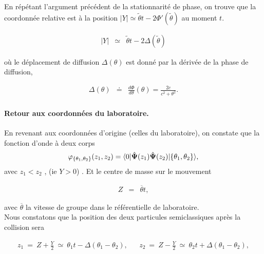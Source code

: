 En répétant l'argument précédent de la stationnarité de phase, on trouve que la coordonnée relative est à la position $\vert Y \vert  \simeq \tilde{\theta} t - 2\Phi'( \tilde{\theta})$ au moment $t$. %

\begin{eqnarray}
	\vert Y \vert & \simeq & 	\tilde{\theta} t  - 2 \Delta (\tilde{\theta} )
\end{eqnarray}

où le déplacement de diffusion $\Delta (\theta)$ est donné par la dérivée de la phase de diffusion,

\begin{eqnarray}\label{eq:I-1-16}
	\Delta ( \theta ) & \doteq & \frac{ d \Phi }{ d \theta } ( \theta )= \frac{ 2 c }{ c^2 + \theta^2} . 	
\end{eqnarray}


\paragraph{Retour aux coordonnées du laboratoire.}
En revenant aux coordonnées d'origine (celles du laboratoire), on constate que la fonction d'onde à deux corps 
\begin{eqnarray}
	\varphi_{\{\theta_1 , \theta_2\}} (z_1, z_2) = \langle 0 \vert \hat{\bm{\Psi}} (z_1)\hat{\bm{\Psi}} (z_2) \vert \{\theta_1, \theta_2\} \rangle,
\end{eqnarray}
avec \(z_1 < z_2\) , (ie $Y>0$) . Et le centre de masse sur le mouvement

\begin{eqnarray}
	Z & = & \overline{\theta} t ,	
\end{eqnarray}

avec $\overline{\theta}$ la vitesse de groupe dans le référentielle de laboratoire.\\

Nous constatons que la position des deux particules semiclassiques après la collision sera

\begin{eqnarray}
	z_1 ~=~ Z + \frac{Y}2 ~\simeq ~ \theta_1 t - \Delta(\theta_1 - \theta_2), & & 	z_2 ~=~ Z - \frac{Y}2 ~\simeq ~ \theta_2t + \Delta(\theta_1 - \theta_2),
\end{eqnarray}

